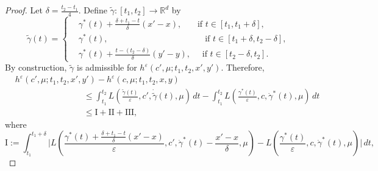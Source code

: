 \documentclass[reqno,11pt]{amsart}
\numberwithin{equation}{section}
\newcommand{\R}{\mathbb{R}} %
\newcommand{\e}{\varepsilon}
\newcommand{\ep}{\varepsilon}
\begin{document}
\begin{proof}
Let $\delta=\frac{t_2-t_1}{4}$. Define $\tilde{\gamma}:[t_1, t_2]\to \R^d$ by
\[
   \tilde{\gamma}(t) = \left\{\begin{aligned}
   & \gamma^\ast(t)+\frac{\delta+t_1-t}{\delta}\left(x'-x\right), \quad \,\,\,  \text{ if } t\in \left[t_1, t_1+\delta\right], \\
   &\gamma^\ast(t), \qquad \qquad \qquad \qquad \qquad  \quad \text{ if } t \in \left[t_1+\delta,t_2-\delta\right],\\
   &\gamma^\ast(t)+\frac{t-\left(t_2-\delta\right)}{\delta}\left(y'-y\right), \quad  \text{ if } t\in \left[t_2-\delta, t_2\right].
   \end{aligned}
   \right.
\]
By construction, $\tilde{\gamma}$ is admissible for $h^\e (c',\mu;t_1,t_2, x',y')$. Therefore,
\[
\begin{aligned}
&h^\e (c',\mu;t_1,t_2, x',y')-h^\e (c,\mu;t_1,t_2, x,y) \\
&\qquad \qquad\qquad\qquad\le
\int_{t_1}^{t_2} L\left(\frac{\tilde\gamma(t)}{\ep},c',\dot{\tilde\gamma}(t), \mu\right)\,dt
-\int_{t_1}^{t_2} L\left(
\frac{\gamma^\ast(t)}{\ep},c,
\dot{\gamma}^\ast(t),\mu
\right)\,dt \\
&\qquad\qquad\qquad\qquad\le \mathrm{I}+\mathrm{II}+\mathrm{III},
\end{aligned}
\]
where
\[
\mathrm{I}
:=\int_{t_1}^{t_1+\delta}
\Bigg|
L\left(
\frac{
\gamma^\ast(t)
+\frac{\delta+t_1-t}{\delta}(x'-x)
}{\ep},c',\dot{\gamma}^\ast(t)-\frac{x'-x}{\delta},\mu
\right)
- L\left(
\frac{\gamma^\ast(t)}{\ep},c,
\dot{\gamma}^\ast(t),\mu
\right)
\Bigg|\,dt ,
\]


\end{proof}
\end{document}
